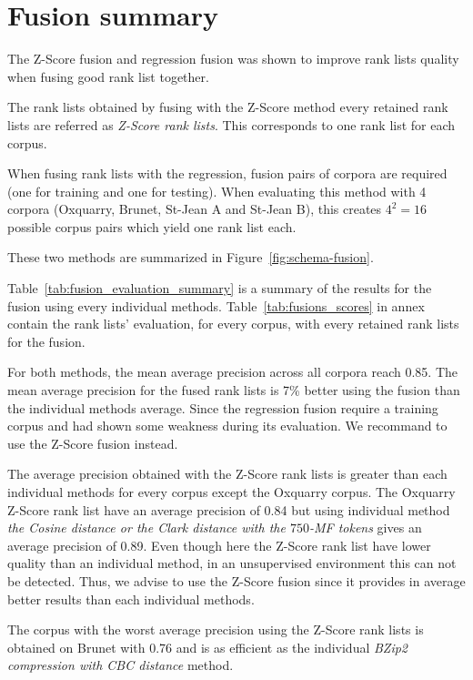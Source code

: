 \section{Fusion summary}

The Z-Score fusion and regression fusion was shown to improve rank lists quality when fusing good rank list together.

The rank lists obtained by fusing with the Z-Score method every retained rank lists are referred as \textit{Z-Score rank lists}.
This corresponds to one rank list for each corpus.

When fusing rank lists with the regression, fusion pairs of corpora are required (one for training and one for testing).
When evaluating this method with 4 corpora (Oxquarry, Brunet, St-Jean A and St-Jean B), this creates $4^2 = 16$ possible corpus pairs which yield one rank list each.

These two methods are summarized in Figure~\ref{fig:schema-fusion}.

Table~\ref{tab:fusion_evaluation_summary} is a summary of the results for the fusion using every individual methods.
Table~\ref{tab:fusions_scores} in annex contain the rank lists' evaluation, for every corpus, with every retained rank lists for the fusion.

For both methods, the mean average precision across all corpora reach 0.85.
The mean average precision for the fused rank lists is 7\% better using the fusion than the individual methods average.
Since the regression fusion require a training corpus and had shown some weakness during its evaluation.
We recommand to use the Z-Score fusion instead.

The average precision obtained with the Z-Score rank lists is greater than each individual methods for every corpus except the Oxquarry corpus.
The Oxquarry Z-Score rank list have an average precision of 0.84 but using individual method \textit{the Cosine distance or the Clark distance with the $750$-MF tokens} gives an average precision of 0.89.
Even though here the Z-Score rank list have lower quality than an individual method, in an unsupervised environment this can not be detected.
Thus, we advise to use the Z-Score fusion since it provides in average better results than each individual methods.

The corpus with the worst average precision using the Z-Score rank lists is obtained on Brunet with 0.76 and is as efficient as the individual \textit{BZip2 compression with CBC distance} method.

